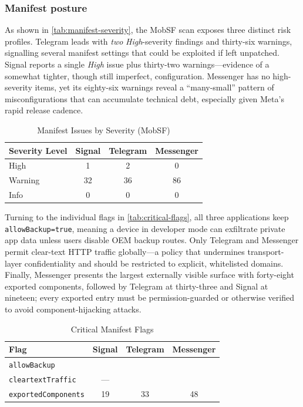 \documentclass[a4paper,12pt]{report}
\newcommand{\cmark}{\ding{51}} %
\begin{document}
\subsubsection{Manifest posture}
As shown in \autoref{tab:manifest-severity}, the MobSF scan exposes three distinct risk profiles.
Telegram leads with \emph{two} \emph{High}-severity findings and thirty-six warnings, signalling several manifest settings that could be exploited if left unpatched.
Signal reports a single \emph{High} issue plus thirty-two warnings—evidence of a somewhat tighter, though still imperfect, configuration.
Messenger has no high-severity items, yet its eighty-six warnings reveal a “many-small” pattern of misconfigurations that can accumulate technical debt, especially given Meta’s rapid release cadence.

\begin{table}[htbp]
  \centering
  \caption{Manifest Issues by Severity (MobSF)}
  \label{tab:manifest-severity}
  \begin{tabular}{|l|c|c|c|}
    \hline
    \textbf{Severity Level} & \textbf{Signal} & \textbf{Telegram} & \textbf{Messenger} \\ \hline
    High      & 1  & 2  & 0  \\ \hline
    Warning   & 32 & 36 & 86 \\ \hline
    Info      & 0  & 0  & 0  \\ \hline
  \end{tabular}
\end{table}

Turning to the individual flags in \autoref{tab:critical-flags}, all three applications keep \lstinline{allowBackup=true}, meaning a device in developer mode can exfiltrate private app data unless users disable OEM backup routes. Only Telegram and Messenger permit clear-text HTTP traffic globally—a policy that undermines transport-layer confidentiality and should be restricted to explicit, whitelisted domains. Finally, Messenger presents the largest externally visible surface with forty-eight exported components, followed by Telegram at thirty-three and Signal at nineteen; every exported entry must be permission-guarded or otherwise verified to avoid component-hijacking attacks.
\begin{table}[htbp]
  \centering
  \caption{Critical Manifest Flags}
  \label{tab:critical-flags}
  \begin{tabular}{|l|c|c|c|}
    \hline
    \textbf{Flag} & \textbf{Signal} & \textbf{Telegram} & \textbf{Messenger} \\ \hline
    \texttt{allowBackup}        & \cmark & \cmark & \cmark \\ \hline
    \texttt{cleartextTraffic}   & —      & \cmark & \cmark \\ \hline
    \texttt{exportedComponents} & 19     & 33     & 48     \\ \hline
  \end{tabular}
\end{table}
\end{document}
